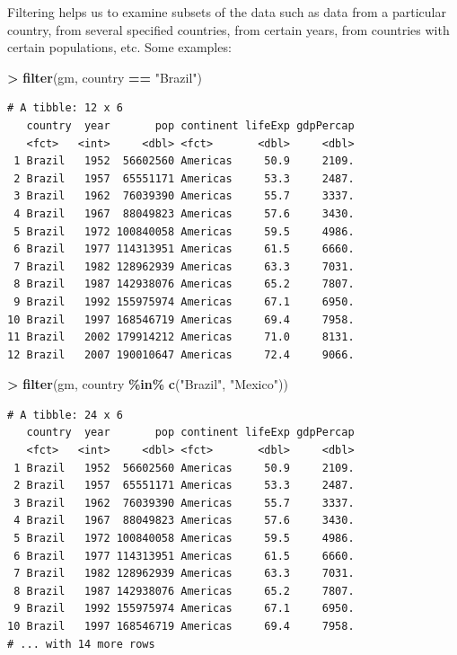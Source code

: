 \documentclass[
]{krantz}
\makeatletter
\newenvironment{Shaded}{\begin{snugshade}}{\end{snugshade}}
\newcommand{\KeywordTok}[1]{\textcolor[rgb]{0.27,0.27,0.27}{\textbf{#1}}}
\newcommand{\NormalTok}[1]{#1}
\newcommand{\OperatorTok}[1]{\textcolor[rgb]{0.43,0.43,0.43}{\textbf{#1}}}
\newcommand{\StringTok}[1]{\textcolor[rgb]{0.5,0.5,0.5}{#1}}
\newenvironment{kframe}{%
\medskip{}
\setlength{\fboxsep}{.8em}
 \def\at@end@of@kframe{}%
 \ifinner\ifhmode%
  \def\at@end@of@kframe{\end{minipage}}%
  \begin{minipage}{\columnwidth}%
 \fi\fi%
 \def\FrameCommand##1{\hskip\@totalleftmargin \hskip-\fboxsep
 \colorbox{shadecolor}{##1}\hskip-\fboxsep
     \hskip-\linewidth \hskip-\@totalleftmargin \hskip\columnwidth}%
 \MakeFramed {\advance\hsize-\width
   \@totalleftmargin\z@ \linewidth\hsize
   \@setminipage}}%
 {\par\unskip\endMakeFramed%
 \at@end@of@kframe}
\renewenvironment{Shaded}{\begin{kframe}}{\end{kframe}}
\makeatother
\begin{document}
Filtering helps us to examine subsets of the data such as data from a particular country, from several specified countries, from certain years, from countries with certain populations, etc. Some examples:

\begin{Shaded}
\begin{Highlighting}[]
\OperatorTok{\textgreater{}}\StringTok{ }\KeywordTok{filter}\NormalTok{(gm, country }\OperatorTok{==}\StringTok{ "Brazil"}\NormalTok{)}
\end{Highlighting}
\end{Shaded}

\begin{verbatim}
# A tibble: 12 x 6
   country  year       pop continent lifeExp gdpPercap
   <fct>   <int>     <dbl> <fct>       <dbl>     <dbl>
 1 Brazil   1952  56602560 Americas     50.9     2109.
 2 Brazil   1957  65551171 Americas     53.3     2487.
 3 Brazil   1962  76039390 Americas     55.7     3337.
 4 Brazil   1967  88049823 Americas     57.6     3430.
 5 Brazil   1972 100840058 Americas     59.5     4986.
 6 Brazil   1977 114313951 Americas     61.5     6660.
 7 Brazil   1982 128962939 Americas     63.3     7031.
 8 Brazil   1987 142938076 Americas     65.2     7807.
 9 Brazil   1992 155975974 Americas     67.1     6950.
10 Brazil   1997 168546719 Americas     69.4     7958.
11 Brazil   2002 179914212 Americas     71.0     8131.
12 Brazil   2007 190010647 Americas     72.4     9066.
\end{verbatim}

\begin{Shaded}
\begin{Highlighting}[]
\OperatorTok{\textgreater{}}\StringTok{ }\KeywordTok{filter}\NormalTok{(gm, country }\OperatorTok{\%in\%}\StringTok{ }\KeywordTok{c}\NormalTok{(}\StringTok{"Brazil"}\NormalTok{, }\StringTok{"Mexico"}\NormalTok{))}
\end{Highlighting}
\end{Shaded}

\begin{verbatim}
# A tibble: 24 x 6
   country  year       pop continent lifeExp gdpPercap
   <fct>   <int>     <dbl> <fct>       <dbl>     <dbl>
 1 Brazil   1952  56602560 Americas     50.9     2109.
 2 Brazil   1957  65551171 Americas     53.3     2487.
 3 Brazil   1962  76039390 Americas     55.7     3337.
 4 Brazil   1967  88049823 Americas     57.6     3430.
 5 Brazil   1972 100840058 Americas     59.5     4986.
 6 Brazil   1977 114313951 Americas     61.5     6660.
 7 Brazil   1982 128962939 Americas     63.3     7031.
 8 Brazil   1987 142938076 Americas     65.2     7807.
 9 Brazil   1992 155975974 Americas     67.1     6950.
10 Brazil   1997 168546719 Americas     69.4     7958.
# ... with 14 more rows
\end{verbatim}
\end{document}
